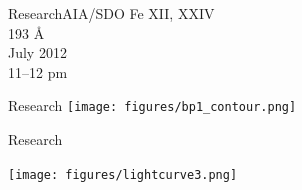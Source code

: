 \documentclass[table]{beamer}
\begin{document}
{%
\begin{frame}[t]{Research}{AIA/SDO}
    \hspace{-2em}Fe {\footnotesize XII, XXIV}\\
    \hspace{-2em}193 \AA{}\\
    \hspace{-2em}July 2012\\
    \hspace{-2em}11--12 pm
\end{frame}}%
%
\begin{frame}[c]{Research}
    \texttt{[image: figures/bp1\_contour.png]}
\end{frame}%
\begin{frame}{Research}
    \begin{center}
        \texttt{[image: figures/lightcurve3.png]}
    \end{center}
\end{frame}%
\end{document}
